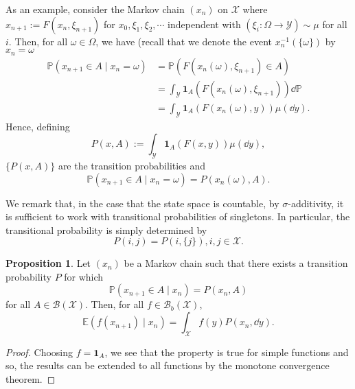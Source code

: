 \documentclass[]{article}
\theoremstyle{definition}
\theoremstyle{definition}
\newtheorem{proposition}{Proposition}[section]
\begin{document}
As an example, consider the Markov chain \((x_n)\) on \(\mathcal{X}\) where 
\(x_{n + 1} := F(x_n, \xi_{n + 1})\) for \(x_0, \xi_1, \xi_2, \cdots\)
independent with \((\xi_i : \Omega \to \mathcal{Y}) \sim \mu\) for all \(i\). 
Then, for all \(\omega \in \Omega\), we have (recall that we denote the event 
\(x_n^{-1}(\{\omega\})\) by \(x_n = \omega\)
\[\begin{split}
  \mathbb{P}(x_{n + 1} \in A \mid x_n = \omega) & = \mathbb{P}(F(x_n(\omega), \xi_{n + 1}) \in A)\\
  & = \int_{\mathcal{Y}} \mathbf{1}_A(F(x_n(\omega), \xi_{n + 1})) \dd \mathbb{P}\\
  & = \int_{\mathcal{Y}} \mathbf{1}_A(F(x_n(\omega), y)) \mu(\dd y).
\end{split}\]
Hence, defining 
\[P(x, A) := \int_{\mathcal{Y}} \mathbf{1}_A(F(x, y)) \mu(\dd y),\]
\(\{P(x, A)\}\) are the transition probabilities and 
\[\mathbb{P}(x_{n + 1} \in A \mid x_n = \omega) = P(x_n(\omega), A).\]

We remark that, in the case that the state space is countable, by \(\sigma\)-additivity,
it is sufficient to work with transitional probabilities of singletons. In particular, 
the transitional probability is simply determined by 
\[P(i, j) = P(i, \{j\}), i, j \in \mathcal{X}.\]

\begin{proposition}
  Let \((x_n)\) be a Markov chain such that there exists a transition 
  probability \(P\) for which 
  \[\mathbb{P}(x_{n + 1} \in A \mid x_n) = P(x_n, A)\]
  for all \(A \in \mathcal{B}(\mathcal{X})\). Then, for all \(f \in \mathcal{B}_b(\mathcal{X})\),
  \[\mathbb{E}(f(x_{n + 1}) \mid x_n) = \int_{\mathcal{X}} f(y) P(x_n, \dd y).\]
\end{proposition}
\begin{proof}
  Choosing \(f = \mathbf{1}_A\), we see that the property is true for simple functions 
  and so, the results can be extended to all functions by the monotone convergence theorem.
\end{proof}
\end{document}
